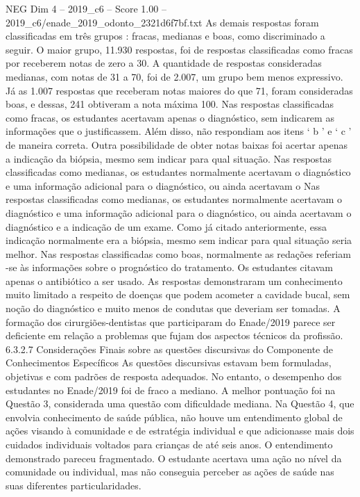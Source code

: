 \begin{textsample}{NEG Dim 4 – 2019\_c6 – Score 1.00 – 2019\_c6/enade\_2019\_odonto\_2321d6f7bf.txt}
As demais respostas foram classificadas em três grupos : fracas, medianas e boas, como discriminado a seguir.
O maior grupo, 11.930 respostas, foi de respostas classificadas como fracas por receberem notas de zero a 30.
A quantidade de respostas consideradas medianas, com notas de 31 a 70, foi de 2.007, um grupo bem menos expressivo.
Já as 1.007 respostas que receberam notas maiores do que 71, foram consideradas boas, e dessas, 241 obtiveram a nota máxima 100.
Nas respostas classificadas como fracas, os estudantes acertavam apenas o diagnóstico, sem indicarem as informações que o justificassem.
Além disso, não respondiam aos itens ‘ b ’ e ‘ c ’ de maneira correta.
Outra possibilidade de obter notas baixas foi acertar apenas a indicação da biópsia, mesmo sem indicar para qual situação.
Nas respostas classificadas como medianas, os estudantes normalmente acertavam o diagnóstico e uma informação adicional para o diagnóstico, ou ainda acertavam o Nas respostas classificadas como medianas, os estudantes normalmente acertavam o diagnóstico e uma informação adicional para o diagnóstico, ou ainda acertavam o diagnóstico e a indicação de um exame.
Como já citado anteriormente, essa indicação normalmente era a biópsia, mesmo sem indicar para qual situação seria melhor.
Nas respostas classificadas como boas, normalmente as redações referiam -se às informações sobre o prognóstico do tratamento.
Os estudantes citavam apenas o antibiótico a ser usado.
As respostas demonstraram um conhecimento muito limitado a respeito de doenças que podem acometer a cavidade bucal, sem noção do diagnóstico e muito menos de condutas que deveriam ser tomadas.
A formação dos cirurgiões-dentistas que participaram do Enade/2019 parece ser deficiente em relação a problemas que fujam dos aspectos técnicos da profissão. 6.3.2.7 Considerações Finais sobre as questões discursivas do Componente de Conhecimentos Específicos As questões discursivas estavam bem formuladas, objetivas e com padrões de resposta adequados.
No entanto, o desempenho dos estudantes no Enade/2019 foi de fraco a mediano.
A melhor pontuação foi na Questão 3, considerada uma questão com dificuldade mediana.
Na Questão 4, que envolvia conhecimento de saúde pública, não houve um entendimento global de ações visando à comunidade e de estratégia individual e que adicionasse mais dois cuidados individuais voltados para crianças de até seis anos.
O entendimento demonstrado pareceu fragmentado.
O estudante acertava uma ação no nível da comunidade ou individual, mas não conseguia perceber as ações de saúde nas suas diferentes particularidades.

\end{textsample}

